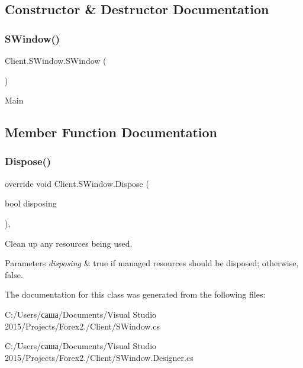 \subsection{Constructor \& Destructor Documentation}
\hypertarget{class_client_1_1_s_window_a7688faaaf1b0ea097066142fc9d90326}{}\label{class_client_1_1_s_window_a7688faaaf1b0ea097066142fc9d90326} 
\subsubsection{\texorpdfstring{S\+Window()}{SWindow()}}
{\footnotesize\ttfamily Client.\+S\+Window.\+S\+Window (\begin{DoxyParamCaption}{ }\end{DoxyParamCaption})\hspace{0.3cm}{\ttfamily [inline]}}



Main 



\subsection{Member Function Documentation}
\hypertarget{class_client_1_1_s_window_a06a09e3c69c7ed01bf7a96ebbc90c12b}{}\label{class_client_1_1_s_window_a06a09e3c69c7ed01bf7a96ebbc90c12b} 
\subsubsection{\texorpdfstring{Dispose()}{Dispose()}}
{\footnotesize\ttfamily override void Client.\+S\+Window.\+Dispose (\begin{DoxyParamCaption}\item[{bool}]{disposing }\end{DoxyParamCaption})\hspace{0.3cm}{\ttfamily [inline]}, {\ttfamily [protected]}}



Clean up any resources being used. 


\begin{DoxyParams}{Parameters}
{\em disposing} & true if managed resources should be disposed; otherwise, false.\\
\hline
\end{DoxyParams}


The documentation for this class was generated from the following files\+:\begin{DoxyCompactItemize}
\item 
C\+:/\+Users/саша/\+Documents/\+Visual Studio 2015/\+Projects/\+Forex2./\+Client/S\+Window.\+cs\item 
C\+:/\+Users/саша/\+Documents/\+Visual Studio 2015/\+Projects/\+Forex2./\+Client/S\+Window.\+Designer.\+cs\end{DoxyCompactItemize}
